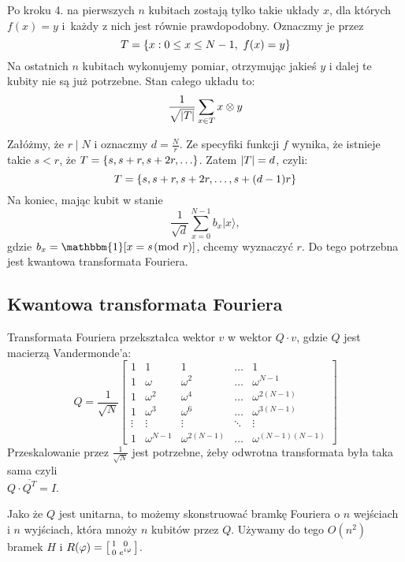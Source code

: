 Po kroku 4. na pierwszych \( n \) kubitach zostają tylko takie układy \( x \), dla których \( f(x) = y \) i~każdy z nich jest równie prawdopodobny.
Oznaczmy je przez
\[
    T = \set{x : 0 \leq x \leq N-1,\ f(x) = y}
\]
Na ostatnich \( n \) kubitach wykonujemy pomiar, otrzymując jakieś \( y \) i dalej te kubity nie są już potrzebne. Stan całego układu to:
\[
    \frac{1}{\sqrt{\left\lvert T\right\rvert}} \sum_{x \in T} x \otimes y
\]

Załóżmy, że \( r \mid N \) i oznaczmy \( d = \frac{N}{r} \). Ze specyfiki funkcji \( f \) wynika, że istnieje takie \( s < r \), że \( T = \set{s, s + r, s + 2r, \ldots} \). Zatem \( \left\lvert T\right\rvert = d \), czyli:
\[
    T = \set{s, s + r, s + 2r, \ldots, s + (d - 1)r}
\]
Na koniec, mając kubit w stanie 
\[
    \frac{1}{\sqrt{d}} \sum_{x=0}^{N-1} b_x |x\rangle,
\]
gdzie \( b_x = \mathbbm{1}[x = s \!\!\pmod{r}] \), chcemy wyznaczyć \( r \). Do tego potrzebna jest kwantowa transformata Fouriera.

\subsection*{Kwantowa transformata Fouriera}
Transformata Fouriera przekształca wektor \( v \) w wektor \( Q \cdot v \), gdzie \( Q \) jest macierzą Vandermonde'a:
\[
    Q = \frac{1}{\sqrt{N}} \begin{bmatrix}
        1 & 1 & 1 & \ldots & 1 \\
        1 & \omega & \omega^2 & \ldots & \omega^{N-1} \\
        1 & \omega^2 & \omega^4 & \ldots & \omega^{2(N-1)} \\
        1 & \omega^3 & \omega^6 & \ldots & \omega^{3(N-1)} \\
        \vdots & \vdots & \vdots & \ddots & \vdots \\
        1 & \omega^{N-1} & \omega^{2(N-1)} & \ldots & \omega^{(N-1)(N-1)}
    \end{bmatrix}
\]
Przeskalowanie przez \( \frac{1}{\sqrt{N}} \) jest potrzebne, żeby odwrotna transformata była taka sama czyli \\ \( Q \cdot \overline{Q^T} = I \).

Jako że \( Q \) jest unitarna, to możemy skonstruować bramkę Fouriera o \( n \) wejściach i \( n \) wyjściach, która mnoży \( n \) kubitów przez \( Q \).
Używamy do tego \( O(n^2) \) bramek \( H \) i \( R(\varphi) =
\left[\begin{smallmatrix}
    1 & 0 \\
    0 & e^{i\varphi}
\end{smallmatrix}\right]
\).

